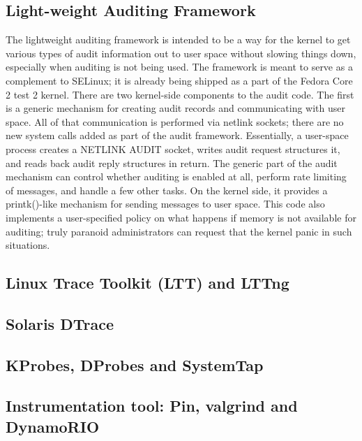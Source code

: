 \subsection{Light-weight Auditing Framework}

The lightweight auditing framework is intended to be a way for the kernel to
get various types of audit information out to user space without slowing things
down, especially when auditing is not being used. The framework is meant to
serve as a complement to SELinux; it is already being shipped as a part of the
Fedora Core 2 test 2 kernel. There are two kernel-side components to the audit
code. The first is a generic mechanism for creating audit records and
communicating with user space. All of that communication is performed via
netlink sockets; there are no new system calls added as part of the audit
framework. Essentially, a user-space process creates a NETLINK AUDIT socket,
writes audit request structures it, and reads back audit reply structures in
return. The generic part of the audit mechanism can control whether auditing is
enabled at all, perform rate limiting of messages, and handle a few other
tasks. On the kernel side, it provides a printk()-like mechanism for sending
messages to user space. This code also implements a user-specified policy on
what happens if memory is not available for auditing; truly paranoid
administrators can request that the kernel panic in such situations.

\subsection{Linux Trace Toolkit (LTT) and LTTng}

\subsection{Solaris DTrace}

\subsection{KProbes, DProbes and SystemTap}

\subsection{Instrumentation tool: Pin, valgrind and DynamoRIO}
\label{sec:instrumentation}
